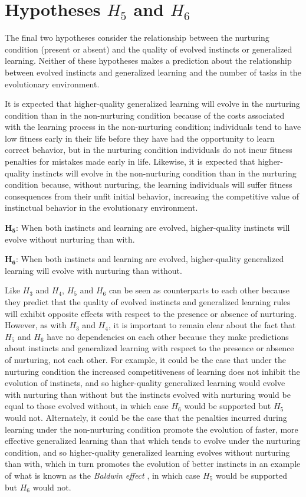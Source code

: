 \documentclass[master]{outhesis}
\begin{document}
\section{Hypotheses $H_5$ and $H_6$}

The final two hypotheses consider the relationship between the nurturing condition (present or absent) and the quality of evolved instincts or generalized learning. Neither of these hypotheses makes a prediction about the relationship between evolved instincts and generalized learning and the number of tasks in the evolutionary environment.

It is expected that higher-quality generalized learning will evolve in the nurturing condition than in the non-nurturing condition because of the costs associated with the learning process in the non-nurturing condition; individuals tend to have low fitness early in their life before they have had the opportunity to learn correct behavior, but in the nurturing condition individuals do not incur fitness penalties for mistakes made early in life.
Likewise, it is expected that higher-quality instincts will evolve in the non-nurturing condition than in the nurturing condition because, without nurturing, the learning individuals will suffer fitness consequences from their unfit initial behavior, increasing the competitive value of instinctual behavior in the evolutionary environment.

$\mathbf{H_5}$: When both instincts and learning are evolved, higher-quality instincts will evolve without nurturing than with.

$\mathbf{H_6}$: When both instincts and learning are evolved, higher-quality generalized learning will evolve with nurturing than without.

Like $H_3$ and $H_4$, $H_5$ and $H_6$ can be seen as counterparts to each other
because they predict that the quality of evolved instincts and generalized learning rules will exhibit opposite effects with respect to the presence or absence of nurturing.
However, as with $H_3$ and $H_4$, it is important to remain clear about the fact that $H_5$ and $H_6$ have no dependencies on each other because they make predictions about instincts and generalized learning with respect to the presence or absence of nurturing, not each other.
For example, it could be the case that under the nurturing condition the increased competitiveness of learning does not inhibit the evolution of instincts,
and so higher-quality generalized learning would evolve with nurturing than without but the instincts evolved with nurturing would be equal to those evolved without,
in which case $H_6$ would be supported but $H_5$ would not.
Alternately, it could be the case that the penalties incurred during learning under the non-nurturing condition promote the evolution of faster, more effective generalized learning than that which tends to evolve under the nurturing condition,
and so higher-quality generalized learning evolves without nurturing than with,
which in turn promotes the evolution of better instincts in an example of what is known as the \emph{Baldwin effect} \citep{Floreano:2008wv},
in which case $H_5$ would be supported but $H_6$ would not.
\end{document}
